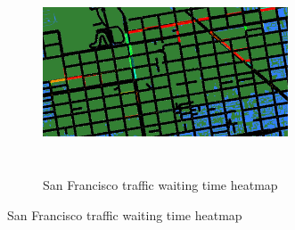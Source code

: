 \begin{figure}[t]
\centering
	\begin{subfigure}[h]{1\textwidth}
	\centering
	\includegraphics[width=0.8\textwidth,height=6cm]{img/SanFrancisco/SanFrancisco4}
	\caption{San Francisco traffic waiting time heatmap}
	\label{fig:SanFrancisco_waiting}
	\end{subfigure}
	

\end{figure}
